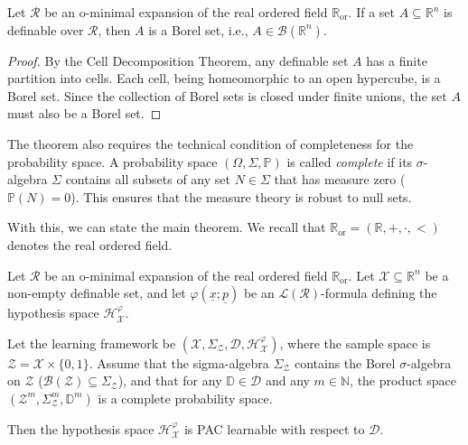 \begin{lemma}
    \label{lem:definable-is-borel}
    Let $\mathcal{R}$ be an o-minimal expansion of the real ordered field $\mathbb{R}_{\text{or}}$. If a set $A \subseteq \mathbb{R}^n$ is definable over $\mathcal{R}$, then $A$ is a Borel set, i.e., $A \in \mathcal{B}(\mathbb{R}^n)$.
\end{lemma}
\begin{proof}

    By the Cell Decomposition Theorem, any definable set $A$ has a finite partition into cells. Each cell, being homeomorphic to an open hypercube, is a Borel set. Since the collection of Borel sets is closed under finite unions, the set $A$ must also be a Borel set.
\end{proof}

The theorem also requires the technical condition of completeness for the probability space. A probability space $(\Omega, \Sigma, \mathbb{P})$ is called \emph{complete} if its $\sigma$-algebra $\Sigma$ contains all subsets of any set $N \in \Sigma$ that has measure zero ($\mathbb{P}(N)=0$). This ensures that the measure theory is robust to null sets.

With this, we can state the main theorem. We recall that $\mathbb{R}_{\text{or}} = (\mathbb{R}, +, \cdot, <)$ denotes the real ordered field.

\begin{theorem}
    \label{thm:main-pac-o-minimal}
    Let $\mathcal{R}$ be an o-minimal expansion of the real ordered field $\mathbb{R}_{\text{or}}$. Let $\mathcal{X} \subseteq \mathbb{R}^n$ be a non-empty definable set, and let $\varphi(\underline{x}; \underline{p})$ be an $\mathcal{L}(\mathcal{R})$-formula defining the hypothesis space $\mathcal{H}_\mathcal{X}^\varphi$.

    Let the learning framework be $(\mathcal{X}, \Sigma_{\mathcal{Z}}, \mathcal{D}, \mathcal{H}_\mathcal{X}^\varphi)$, where the sample space is $\mathcal{Z} = \mathcal{X} \times \{0,1\}$. Assume that the sigma-algebra $\Sigma_{\mathcal{Z}}$ contains the Borel $\sigma$-algebra on $\mathcal{Z}$ ($\mathcal{B}(\mathcal{Z}) \subseteq \Sigma_{\mathcal{Z}}$), and that for any $\mathbb{D} \in \mathcal{D}$ and any $m \in \mathbb{N}$, the product space $(\mathcal{Z}^m, \Sigma_{\mathcal{Z}}^m, \mathbb{D}^m)$ is a complete probability space.

    Then the hypothesis space $\mathcal{H}_\mathcal{X}^\varphi$ is PAC learnable with respect to $\mathcal{D}$.
\end{theorem}

